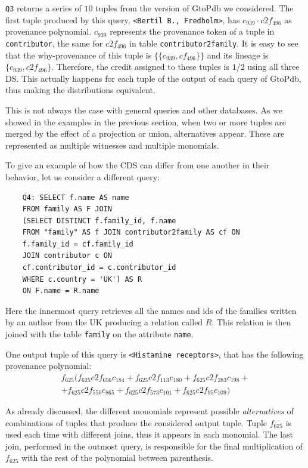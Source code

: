 \texttt{Q3} returns a series of $10$ tuples from the version of GtoPdb we considered. 
The first tuple produced by this query, \texttt{<Bertil B., Fredholm>}, has $c_{939} \cdot c2f_{496}$ as provenance polynomial.
$c_{939}$ represents the provenance token of a tuple in \texttt{contributor}, the same for $c2f_{496}$ in table \texttt{contributor2family}. 
It is easy to see that the why-provenance of this tuple is $\{\{c_{939}, cf_{496} \}\}$ and its lineage is $\{c_{939}, c2f_{496} \}$.
Therefore, the credit assigned to these tuples is $1/2$ using all three DS.
This actually happens for each tuple of the output of each query of GtoPdb, thus making the distributions equivalent.

This is not always the case with general queries and other databases. As we showed in the examples in the previous section, when two or more tuples are merged by the effect of a projection or union, alternatives appear. These are represented as multiple witnesses and multiple monomials. 

To give an example of how the CDS can differ from one another in their behavior, let us consider a different query:
\begin{verbatim}
	Q4: SELECT f.name AS name
	FROM family AS F JOIN
	(SELECT DISTINCT f.family_id, f.name
	FROM "family" AS f JOIN contributor2family AS cf ON 
	f.family_id = cf.family_id 
	JOIN contributor c ON 
	cf.contributor_id = c.contributor_id 
	WHERE c.country = 'UK') AS R 
	ON F.name = R.name
\end{verbatim}

Here the innermost query retrieves all the names and ids of the families written by an author from the UK producing a relation called $R$. This relation is then joined with the table \texttt{family} on the attribute \texttt{name}. 

One output tuple of this query is \texttt{<Histamine receptors>}, that has the following provenance polynomial:
\[
\begin{array}{c}
	f_{625}(f_{625} c2f_{656} c_{184} + f_{625} c2f_{113} c_{180} + f_{625} c2f_{283} c_{198} +\\ 
	+ f_{625} c2f_{550} c_{865} + f_{625} c2f_{573} c_{101} + f_{625} c2f_{95} c_{109} )
\end{array}
\]

As already discussed, the different monomials represent possible \emph{alternatives} of combinations of tuples that produce the considered output tuple. 
Tuple $f_{625}$ is used each time with different joins, thus it appears in each monomial. 
The last join, performed in the outmost query, is responsible for the final multiplication of $f_{625}$ with the rest of the polynomial between parenthesis.

